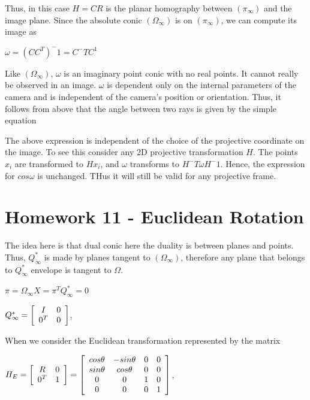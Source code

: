 \documentclass[]{article}
\begin{document}
Thus, in this case $H = CR$ is the planar homography between $(\pi _ \infty)$ and the image plane. Since the absolute conic $(\Omega _ \infty)$ is on $(\pi _ \infty)$, we can compute its image as 

\centerline {
	$\omega = (CC^T)^-1 = C^-TC^1$
}
 
Like  $(\Omega _ \infty)$, $\omega$ is an imaginary point conic with no real points. It cannot really be observed in an image. $\omega$ is dependent only on the internal parameters of the camera and is independent of the camera's position or orientation. Thus,
it follows from above that the angle between two rays is given by the simple equation 

The above expression is independent of the choice of the projective coordinate on the image. To see this consider any 2D projective transformation $H$. The points $x_i$ are transformed to $Hx_i$, and $\omega$ transforms to $H^-T \omega H^-1$. Hence, the expression for $cos \omega$ is unchanged. THus it will still be valid for any projective frame. 


\section{Homework 11 - Euclidean Rotation}

The idea here is that dual conic here the duality is between planes and points. Thus, $Q_ \infty ^*$ is made by planes tangent to $(\Omega _ \infty)$, therefore any plane that belongs to $Q_ \infty ^*$ envelope is tangent to $\Omega$. 

\centerline {
	$\pi = \Omega _ \infty X = \pi ^TQ_ \infty ^* = 0$ 
}

\centerline {
	$Q_ \infty ^* = \left[ {\begin{array}{*{20}c}
		I & 0 \\
		0^T & 0   
		\end{array} } \right]$,
}

When we consider the Euclidean transformation represented by the matrix 

\centerline {
	$H_E = \left[ {\begin{array}{*{20}c}
		R & 0 \\
		0^T & 1   
		\end{array} } \right] =  \left[ {\begin{array}{*{20}c}
		cos \theta & -sin \theta & 0 & 0 \\
		sin \theta & cos \theta  & 0 & 0 \\ 
		0 & 0 & 1 & 0 \\ 
		0 & 0 & 0 & 1   
		\end{array} } \right] $,
}
\end{document}
